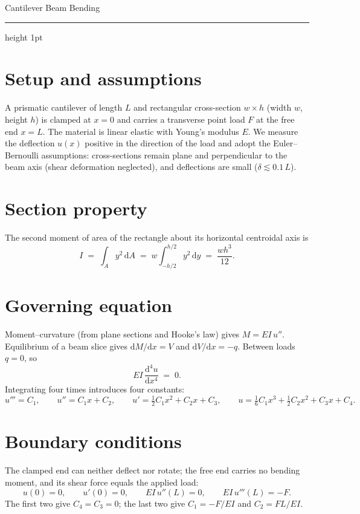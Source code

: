 \documentclass[10pt,a4paper]{article}
\begin{document}
{\LARGE Cantilever Beam Bending}
\medskip
{\color{celline}\hrule height 1pt}

\section*{Setup and assumptions}
A prismatic cantilever of length $L$ and rectangular cross-section $w \times h$
(width $w$, height $h$) is clamped at $x = 0$ and carries a transverse point load
$F$ at the free end $x = L$. The material is linear elastic with Young's modulus
$E$. We measure the deflection $u(x)$ positive in the direction of the load and
adopt the Euler--Bernoulli assumptions: cross-sections remain plane and
perpendicular to the beam axis (shear deformation neglected), and deflections are
small ($\delta \lesssim 0.1\,L$).

\section*{Section property}
The second moment of area of the rectangle about its horizontal centroidal axis is
\begin{equation}
I \;=\; \int_A y^2 \,\mathrm{d}A \;=\; w \int_{-h/2}^{h/2} y^2 \,\mathrm{d}y
\;=\; \frac{w h^3}{12}.
\end{equation}

\section*{Governing equation}
Moment--curvature (from plane sections and Hooke's law) gives $M = EI\,u''$.
Equilibrium of a beam slice gives $\mathrm{d}M/\mathrm{d}x = V$ and
$\mathrm{d}V/\mathrm{d}x = -q$. Between loads $q = 0$, so
\begin{equation}
EI \,\frac{\mathrm{d}^4 u}{\mathrm{d}x^4} \;=\; 0 .
\end{equation}
Integrating four times introduces four constants:
\begin{equation}
u''' = C_1, \qquad
u'' = C_1 x + C_2, \qquad
u' = \tfrac{1}{2}C_1 x^2 + C_2 x + C_3, \qquad
u = \tfrac{1}{6}C_1 x^3 + \tfrac{1}{2}C_2 x^2 + C_3 x + C_4 .
\end{equation}

\section*{Boundary conditions}
The clamped end can neither deflect nor rotate; the free end carries no bending
moment, and its shear force equals the applied load:
\begin{equation}
u(0) = 0, \qquad u'(0) = 0, \qquad EI\,u''(L) = 0, \qquad EI\,u'''(L) = -F .
\end{equation}
The first two give $C_4 = C_3 = 0$; the last two give $C_1 = -F/EI$ and
$C_2 = FL/EI$.
\end{document}
